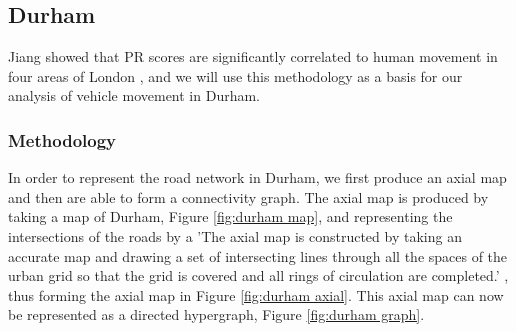 \documentclass[11pt]{report}
\begin{document}
\subsection{Durham} \label{sec:durham}
Jiang showed that PR scores are significantly correlated to human movement in four areas of London \cite{doi:10.1080/13658810802022822}, and we will use this methodology as a basis for our analysis of vehicle movement in Durham. 
\subsubsection{Methodology}
In order to represent the road network in Durham, we first produce an axial map and then are able to form a connectivity graph. The axial map is produced by taking a map of Durham, Figure \ref{fig:durham map}, and representing the intersections of the roads by a 'The axial map is constructed by taking an accurate map and drawing a set of intersecting lines through all the spaces of the urban grid so that the grid is covered and all rings of circulation are completed.' \cite{Axialmap40:online}, thus forming the axial map in Figure \ref{fig:durham axial}. This axial map can now be represented as a directed hypergraph, Figure \ref{fig:durham graph}. 
\end{document}
